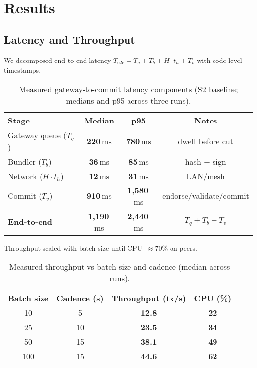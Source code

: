 \documentclass[12pt,onecolumn]{IEEEtran} %
\begin{document}

\section{Results}
\label{sec:results}

\subsection{Latency and Throughput}
\label{subsec:latency-throughput-results}

We decomposed end-to-end latency \(T_{\mathrm{e2e}}=T_q+T_b+H\cdot t_h+T_v\) with code-level timestamps.

\begin{table}[htbp]
  \centering
  \caption{Measured gateway-to-commit latency components (S2 baseline; medians and p95 across three runs).}
  \label{tab:latency-metrics}
  \small
  \begin{tabular}{lccc}
    \toprule
    \textbf{Stage} & \textbf{Median} & \textbf{p95} & \textbf{Notes} \\
    \midrule
    Gateway queue ($T_q$) & \textbf{220}\,ms & \textbf{780}\,ms & dwell before cut \\
    Bundler ($T_b$) & \textbf{36}\,ms & \textbf{85}\,ms & hash + sign \\
    Network ($H\cdot t_h$) & \textbf{12}\,ms & \textbf{31}\,ms & LAN/mesh \\
    Commit ($T_v$) & \textbf{910}\,ms & \textbf{1{,}580}\,ms & endorse/validate/commit \\
    \midrule
    \textbf{End-to-end} & \textbf{1{,}190}\,ms & \textbf{2{,}440}\,ms & $T_q{+}T_b{+}T_v$ \\
    \bottomrule
  \end{tabular}
\end{table}

Throughput scaled with batch size until CPU~$\approx\!70\%$ on peers.

\begin{table}[htbp]
  \centering
  \caption{Measured throughput vs batch size and cadence (median across runs).}
  \label{tab:throughput}
  \small
  \begin{tabular}{cccc}
    \toprule
    \textbf{Batch size} & \textbf{Cadence (s)} & \textbf{Throughput (tx/s)} & \textbf{CPU (\%)} \\
    \midrule
    10 & 5  & \textbf{12.8} & \textbf{22} \\
    25 & 10 & \textbf{23.5} & \textbf{34} \\
    50 & 15 & \textbf{38.1} & \textbf{49} \\
    100 & 15 & \textbf{44.6} & \textbf{62} \\
    \bottomrule
  \end{tabular}
\end{table}
\end{document}
